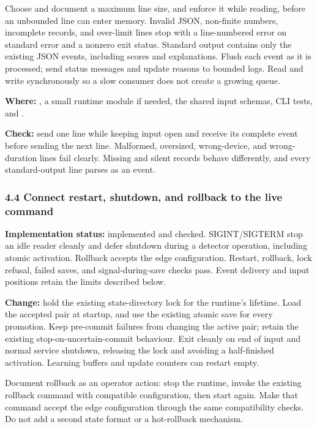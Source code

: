 \documentclass[11pt,a4paper]{article}
\begin{document}
Choose and document a maximum line size, and enforce it while reading, before
an unbounded line can enter memory. Invalid JSON, non-finite numbers, incomplete
records, and over-limit lines stop with a line-numbered error on standard error
and a nonzero exit status. Standard output contains only the existing JSON
events, including scores and explanations. Flush each event as it is processed;
send status messages and update reasons to bounded logs. Read and write
synchronously so a slow consumer does not create a growing queue.

\textbf{Where:} , a small runtime module if needed,
the shared input schemas, CLI tests, and
.

\textbf{Check:} send one line while keeping input open and receive its complete
event before sending the next line. Malformed, oversized, wrong-device, and
wrong-duration lines fail clearly. Missing and silent records behave differently,
and every standard-output line parses as an event.

\subsubsection*{4.4 Connect restart, shutdown, and rollback to the live command}

\textbf{Implementation status:} implemented and checked. SIGINT/SIGTERM stop an
idle reader cleanly and defer shutdown during a detector operation, including
atomic activation. Rollback accepts the edge configuration. Restart, rollback,
lock refusal, failed saves, and signal-during-save checks pass. Event delivery
and input positions retain the limits described below.

\textbf{Change:} hold the existing state-directory lock for the runtime's
lifetime. Load the accepted pair at startup, and use the existing atomic save
for every promotion. Keep pre-commit failures from changing the active pair;
retain the existing stop-on-uncertain-commit behaviour. Exit cleanly on end of
input and normal service shutdown, releasing the lock and avoiding a half-finished
activation. Learning buffers and update counters can restart empty.

Document rollback as an operator action: stop the runtime, invoke the existing
rollback command with compatible configuration, then start again. Make that
command accept the edge configuration through the same compatibility checks.
Do not add a second state format or a hot-rollback mechanism.
\end{document}
